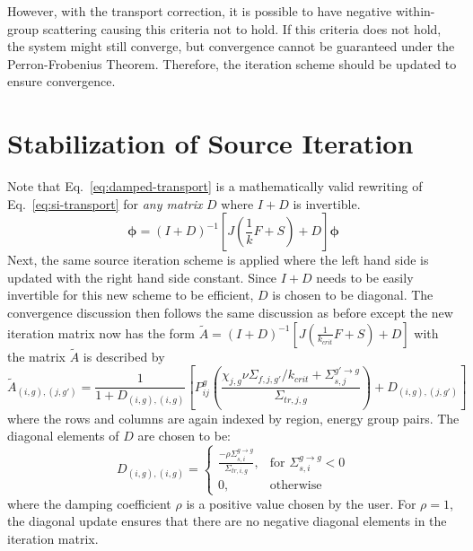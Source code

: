 However, with the transport correction, it is possible to have negative within-group scattering causing this criteria not to hold. If this criteria does not hold, the system might still converge, but convergence cannot be guaranteed under the Perron-Frobenius Theorem. Therefore, the iteration scheme should be updated to ensure convergence. 

\section{Stabilization of Source Iteration}
\label{sec:diagonal-stabilization}

Note that Eq.~\ref{eq:damped-transport} is a mathematically valid rewriting of Eq.~\ref{eq:si-transport} for \textit{any matrix} $D$ where $I+D$ is invertible. 
\begin{equation}
	\boldsymbol{\phi} = (I+D)^{-1} \left[J \left(\frac{1}{k} F + S \right) + D \right]\boldsymbol{\phi}
	\label{eq:damped-transport}
\end{equation}
Next, the same source iteration scheme is applied where the left hand side is updated with the right hand side constant. Since $I+D$ needs to be easily invertible for this new scheme to be efficient, $D$ is chosen to be diagonal. The convergence discussion then follows the same discussion as before except the new iteration matrix  now has the form $\tilde{A} = (I+D)^{-1} \left[ J \left(\frac{1}{k_{\textit{crit}}} F + S \right) + D \right]$  with the matrix $\tilde{A}$ is described by
\begin{equation}
	\tilde{A}_{(i,g), (j, g')} = \frac{1}{1 + D_{(i,g), (i,g)}}\left[P_{ij}^g \left(\frac{\chi_{j,g} \nu\Sigma_{f,j,g'} / k_{\textit{crit}} + \Sigma_{s,j}^{g' \rightarrow g}}{\Sigma_{\textit{tr}, j, g}}\right) + D_{(i,g), (j, g')}\right]
	\label{eq:a-tilde}
\end{equation}
where the rows and columns are again indexed by region, energy group pairs. The diagonal elements of $D$ are chosen to be:
\begin{equation}
	D_{(i,g), (i,g)} = \left\{\begin{array}{lr}
		\frac{-\rho \Sigma_{s,i}^{g \rightarrow g}}{\Sigma_{\textit{tr}, i, g}} , & \text{for } \Sigma_{s,i}^{g \rightarrow g} < 0\\
		0, & \text{otherwise}
	\end{array}\right.
	\label{eq:d-matrix}
\end{equation}
where the damping coefficient $\rho$ is a positive value chosen by the user. For $\rho = 1$, the diagonal update ensures that there are no negative diagonal elements in the iteration matrix. 

